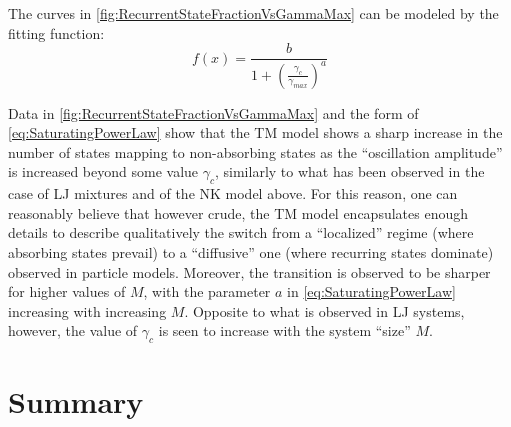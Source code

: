 The curves in \autoref{fig:RecurrentStateFractionVsGammaMax} can be modeled by the fitting function:
\begin{equation}
	f(x) = \frac{b}{1 + \left(\frac{\gamma_{c}}{\gamma_{max}} \right)^{a}}
	\label{eq:SaturatingPowerLaw}
\end{equation}

Data in \autoref{fig:RecurrentStateFractionVsGammaMax} and the form of \autoref{eq:SaturatingPowerLaw} show that the TM model shows a sharp increase in the number of states mapping to non-absorbing states as the ``oscillation amplitude'' is increased beyond some value $\gamma_{c}$, similarly to what has been observed in the case of LJ mixtures and of the NK model above. For this reason, one can reasonably believe that however crude, the TM model encapsulates enough details to describe qualitatively the switch from a ``localized'' regime (where absorbing states prevail) to a ``diffusive'' one (where recurring states dominate) observed in particle models. Moreover, the transition is observed to be sharper for higher values of $M$, with the parameter $a$ in \autoref{eq:SaturatingPowerLaw} increasing with increasing $M$. Opposite to what is observed in LJ systems, however, the value of $\gamma_{c}$ is seen to increase with the system ``size'' $M$.

\section{Summary}

